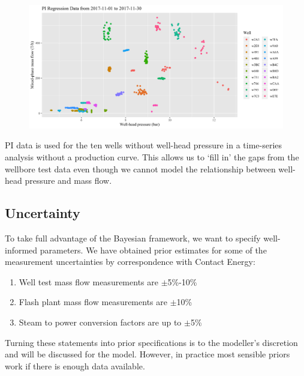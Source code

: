 \documentclass[a4paper, 12pt]{article}
\begin{document}
\begin{figure}
  \centering
  \includegraphics[width=\linewidth]{media/pi_data}
  \label{fig:pi_data}
\end{figure}

PI data is used for the ten wells without well-head pressure in a time-series analysis without a production curve. This allows us to `fill in' the gaps from the wellbore test data even though we cannot model the relationship between well-head pressure and mass flow.

\subsection{Uncertainty}
To take full advantage of the Bayesian framework, we want to specify well-informed parameters. We have obtained prior estimates for some of the measurement uncertainties by correspondence with Contact Energy:

\begin{enumerate}
\item Well test mass flow measurements are $\pm$5\%-10\%
\item Flash plant mass flow measurements are $\pm$10\%
\item Steam to power conversion factors are up to $\pm$5\%
\end{enumerate}

Turning these statements into prior specifications is to the modeller's discretion and will be discussed for the model. However, in practice most sensible priors work if there is enough data available.
\end{document}
